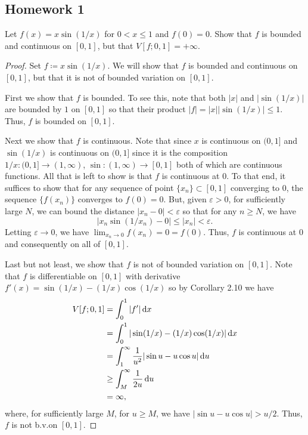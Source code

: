 \subsection{Homework 1}
\begin{problem}
Let $f(x)=x\sin(1/x)$ for $0<x\leq 1$ and $f(0)=0$. Show that $f$ is
bounded and continuous on $[0,1]$, but that $V[f;0,1]=+\infty$.
\end{problem}
\begin{proof}
  Set $f\coloneq x\sin (1/x)$. We will show that $f$ is bounded and
  continuous on $[0,1]$, but that it is not of bounded variation on
  $[0,1]$.

  First we show that $f$ is bounded. To see this, note that both $|x|$ and
  $|\sin (1/x)|$ are bounded by $1$ on $[0,1]$ so that their product
  $|f|=|x||\sin (1/x)|\leq 1$. Thus, $f$ is bounded on $[0,1]$.

  Next we show that $f$ is continuous. Note that since $x$ is continuous
  on $(0,1]$ and $\sin(1/x)$ is continuous on $(0,1]$ since it is the
  composition $1/x\colon (0,1]\to (1,\infty)$, $\sin\colon(1,\infty)\to
  [0,1]$ both of which are continuous functions. All that is left to show
  is that $f$ is continuous at $0$. To that end, it suffices to show that
  for any sequence of point ${\{x_n\}}\subset[0,1]$ converging to $0$, the
  sequence ${\{f(x_n)\}}$ converges to $f(0)=0$. But, given
  $\varepsilon>0$, for sufficiently large $N$, we can bound the distance
  $|x_n-0|<\varepsilon$ so that for any $n\geq N$, we have
  \begin{equation*}
    |x_n\sin(1/x_n)-0|\leq |x_n|<\varepsilon.
  \end{equation*}
  Letting $\varepsilon\to 0$, we have $\lim_{x_n\to 0}f(x_n)=0=f(0)$. Thus,
  $f$ is continuous at $0$ and consequently on all of $[0,1]$.

  Last but not least, we show that $f$ is not of bounded variation on
  $[0,1]$. Note that $f$ is differentiable on $[0,1]$ with derivative
  $f'(x)=\sin(1/x)-(1/x)\cos(1/x)$ so by Corollary 2.10 we have
  \begin{align*}
    V[f;0,1]
    &=\int_0^1|f'|\mathop{}\!\mathrm{d} x\\
    &=\int_0^1|\sin(1/x)-(1/x)\cos(1/x)|\mathop{}\!\mathrm{d} x\\
    &=\int_1^\infty\frac{1}{u^2}|\sin u-u\cos u|\mathop{}\!\mathrm{d} u\\
    &\geq\int_M^\infty\frac{1}{2u}\mathop{}\!\mathrm{d} u\\
    &=\infty,
  \end{align*}
  where, for sufficiently large $M$, for $u\geq M$, we have
  $|\sin u-u\cos u|>u/2$. Thus, $f$ is not b.v.\@ on $[0,1]$.
\end{proof}

